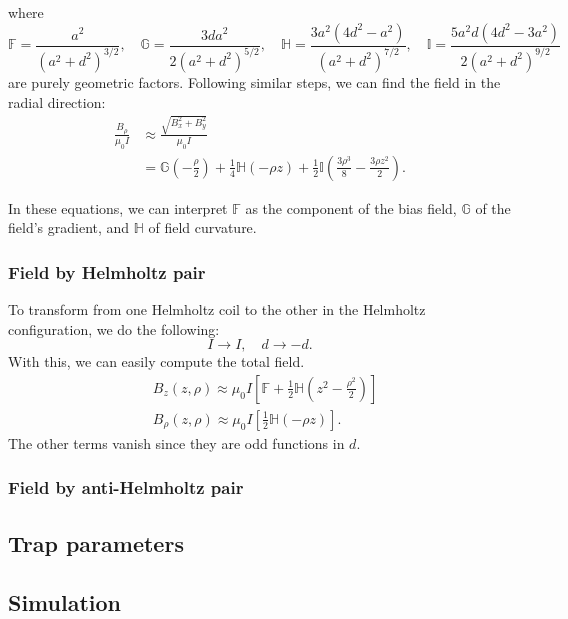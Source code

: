 \documentclass{article}
\theoremstyle{definition}
\newcommand{\f}[2]{\frac{#1}{#2}}
\newcommand{\lp}{\left(}
\newcommand{\rp}{\right)}
\newcommand{\lb}{\left[}
\newcommand{\rb}{\right]}
\begin{document}
where 
\begin{equation*}
\mathbb{F} = \f{a^2}{(a^2+d^2)^{3/2}}, \quad \mathbb{G} = \f{3da^2}{2(a^2+d^2)^{5/2}}, \quad 
\mathbb{H} = \f{3a^2(4d^2-a^2)}{(a^2+d^2)^{7/2}},\quad
\mathbb{I} = \f{5 a^2 d (4 d^2-3a^2)}{2(a^2 + d^2)^{9/2}} 
\end{equation*}
are purely geometric factors. Following similar steps, we can find the field in the radial direction:
\begin{align*}
\f{B_\rho}{\mu_0 I} 
&\approx \f{\sqrt{B_x^2 + B_y^2}}{\mu_0 I} \\
&= \mathbb{G}\lp -\f{\rho}{2} \rp + \f{1}{4}\mathbb{H}(-\rho z) + \f{1}{2}\mathbb{I}\lp \f{3\rho^3}{8} - \f{3\rho z^2}{2} \rp.
\end{align*}

In these equations, we can interpret $\mathbb{F}$ as the component of the bias field, $\mathbb{G}$ of the field's gradient, and $\mathbb{H}$ of field curvature.  


\subsubsection{Field by Helmholtz pair}
To transform from one Helmholtz coil to the other in the Helmholtz configuration, we do the following:
\begin{equation*}
I \to I, \quad d \to -d.
\end{equation*}
With this, we can easily compute the total field.  
\begin{align*}
&B_z(z,\rho) \approx \mu_0 I \lb \mathbb{F} + \f{1}{2}\mathbb{H} \lp z^2 - \f{\rho^2}{2} \rp  \rb\\
&B_\rho(z,\rho) \approx \mu_0 I \lb \f{1}{2}\mathbb{H}(-\rho z) \rb.
\end{align*}
The other terms vanish since they are odd functions in $d$. 



\subsubsection{Field by anti-Helmholtz pair}


\subsection{Trap parameters}

\subsection{Simulation}
\end{document}
